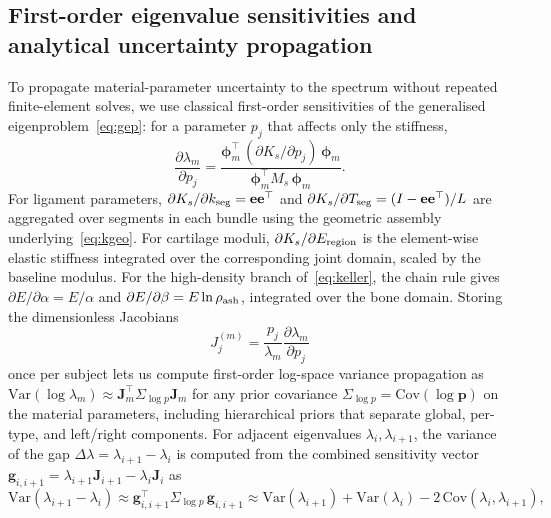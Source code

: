 \documentclass[11pt]{article}
\begin{document}
\subsection{First-order eigenvalue sensitivities and analytical uncertainty propagation}
\label{sec:sensitivities}

To propagate material-parameter uncertainty to the spectrum without repeated finite-element solves, we use classical first-order sensitivities of the generalised eigenproblem~\eqref{eq:gep}: for a parameter $p_j$ that affects only the stiffness,
\begin{equation}
\frac{\partial\lambda_m}{\partial p_j}
=\frac{\boldsymbol\phi_m^\top\,(\partial K_s/\partial p_j)\,\boldsymbol\phi_m}
{\boldsymbol\phi_m^\top M_s\,\boldsymbol\phi_m}.
\label{eq:ev-sensitivity}
\end{equation}
For ligament parameters, $\partial K_s/\partial k_{\rm seg}=\mathbf e\mathbf e^\top$ and $\partial K_s/\partial T_{\rm seg}=(I-\mathbf e\mathbf e^\top)/L$ are aggregated over segments in each bundle using the geometric assembly underlying~\eqref{eq:kgeo}.
For cartilage moduli, $\partial K_s/\partial E_{\rm region}$ is the element-wise elastic stiffness integrated over the corresponding joint domain, scaled by the baseline modulus.
For the high-density branch of~\eqref{eq:keller}, the chain rule gives $\partial E/\partial\alpha=E/\alpha$ and $\partial E/\partial\beta=E\ln\rho_{\rm ash}$, integrated over the bone domain.
Storing the dimensionless Jacobians
\begin{equation}
J_j^{(m)}=\frac{p_j}{\lambda_m}\frac{\partial\lambda_m}{\partial p_j}
\end{equation}
once per subject lets us compute first-order log-space variance propagation as $\mathrm{Var}(\log\lambda_m) \approx \mathbf J_m^\top \Sigma_{\log p} \mathbf J_m$ for any prior covariance $\Sigma_{\log p} = \mathrm{Cov}(\log\mathbf p)$ on the material parameters, including hierarchical priors that separate global, per-type, and left/right components.
For adjacent eigenvalues $\lambda_i, \lambda_{i+1}$, the variance of the gap $\Delta\lambda = \lambda_{i+1}-\lambda_i$ is computed from the combined sensitivity vector $\mathbf g_{i,i+1} = \lambda_{i+1}\mathbf J_{i+1} - \lambda_i\mathbf J_i$ as
\begin{equation}
\mathrm{Var}(\lambda_{i+1}-\lambda_i) \approx \mathbf g_{i,i+1}^\top \Sigma_{\log p}\,\mathbf g_{i,i+1} \approx \mathrm{Var}(\lambda_{i+1}) + \mathrm{Var}(\lambda_i) - 2\,\mathrm{Cov}(\lambda_i, \lambda_{i+1}),
\label{eq:gap-cov}
\end{equation}
\end{document}
